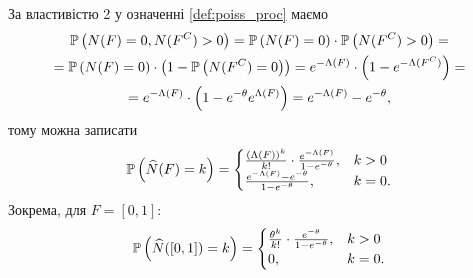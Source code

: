 За властивістю 2 у означенні \ref{def:poiss_proc} маємо
\begin{gather*}
    \P{N(F) = 0, N(F^C) > 0} = \P{N(F) = 0}\cdot \P{N(F^C) > 0} = \\ =
    \P{N(F) = 0} \cdot \left(1 - \P{N(F^C) = 0}\right) = 
    e^{-\Lambda(F)} \cdot \left(1 - e^{-\Lambda(F^C)}\right) = \\ =
    e^{-\Lambda(F)} \cdot \left(1 - e^{-\theta} e^{\Lambda(F)}\right) = 
    e^{-\Lambda(F)} - e^{-\theta},
\end{gather*}
тому можна записати
\begin{gather}
    \P{\widehat{N} (F) = k} =
    \begin{cases}
        \frac{(\Lambda(F))^k}{k!} \cdot \frac{e^{-\Lambda(F)}}{1 - e^{-\theta}}, & k > 0 \\
        \frac{e^{-\Lambda(F)} - e^{-\theta}}{1 - e^{-\theta}}, & k = 0.
    \end{cases}
\end{gather}
Зокрема, для $F = [0, 1]$:
\begin{gather}
    \P{\widehat{N} ([0, 1]) = k} = 
    \begin{cases}
        \frac{\theta^k}{k!} \cdot \frac{e^{-\theta}}{1 - e^{-\theta}}, & k > 0 \\
        0, & k = 0.
    \end{cases}
\end{gather}

